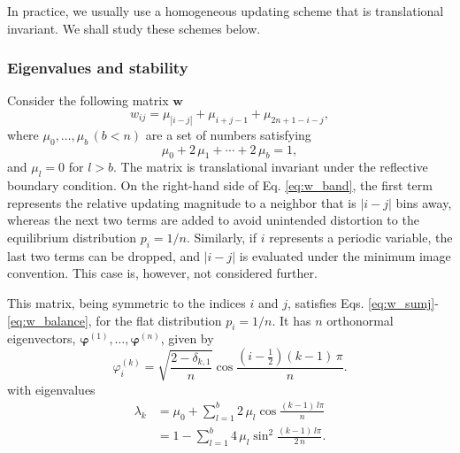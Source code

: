 \documentclass[reprint]{revtex4-1}
\begin{document}
In practice, we usually use a homogeneous updating scheme
that is translational invariant.
%
We shall study these schemes below.


\subsubsection{
Eigenvalues and stability}


Consider the following matrix $\mathbf w$
%
\begin{equation}
  w_{ij}
  =
  \mu_{ |i - j| }
  + \mu_{ i + j - 1 }
  + \mu_{ 2 n + 1 - i - j },
  \label{eq:w_band}
\end{equation}
%
where $\mu_0, \dots, \mu_b \, (b < n)$
are a set of numbers satisfying
%
\begin{equation}
\mu_0 + 2 \, \mu_1 + \cdots + 2 \, \mu_b = 1,
\label{eq:m_normalization}
\end{equation}
%
and $\mu_l = 0$ for $l > b$.
%
The matrix is translational invariant under the reflective
boundary condition\cite{bussi2006}.
%
On the right-hand side of Eq. \eqref{eq:w_band},
the first term represents the relative updating magnitude
to a neighbor that is $|i - j|$ bins away,
whereas the next two terms are added
to avoid unintended distortion
to the equilibrium distribution $p_i = 1/n$\cite{bussi2006}.
%
Similarly, if $i$ represents a periodic variable,
the last two terms can be dropped, and
$|i-j|$ is evaluated
under the minimum image convention\cite{dama2014}.
This case is, however, not considered further.


This matrix, being symmetric to the indices $i$ and $j$,
satisfies Eqs. \eqref{eq:w_sumj}-\eqref{eq:w_balance},
for the flat distribution $p_i = 1/n$.
%
It has $n$ orthonormal eigenvectors,
$\pmb\varphi^{(1)}, \dots, \pmb\varphi^{(n)}$,
given by
%
\begin{equation}
\varphi^{(k)}_i
= \sqrt{
    \frac{ 2 - \delta_{k, 1} }
         {       n           }
       }
  \cos \frac{ \left( i - \frac 1 2 \right) (k - 1) \, \pi}
            {                  n                         }.
\label{eq:wband_eigenvector}
\end{equation}
%
with eigenvalues
%
\begin{align}
  \lambda_k
  &=
  \mu_0 + \sum_{l = 1}^b 2 \, \mu_l \cos \frac{(k - 1)  \, l \pi}{n}
  \label{eq:wband_eigenvalue1}
  \\
  &=
  1 - \sum_{l = 1}^b 4 \, \mu_l \sin^2 \frac{(k - 1)  \, l \pi}{ 2 \, n }
  .
  \label{eq:wband_eigenvalue}
\end{align}
\end{document}
